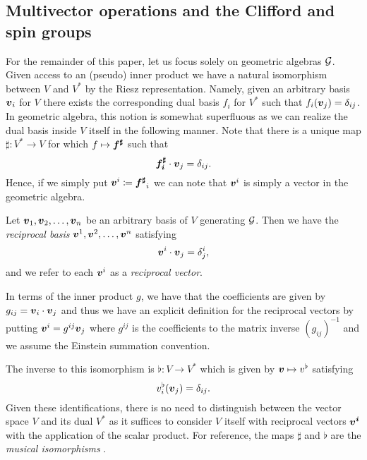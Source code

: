 \subsection{Multivector operations and the Clifford and spin groups}
\label{subsubsec:reverse_inverse_clifford_spin_groups}
For the remainder of this paper, let us focus solely on geometric algebras $\mathcal{G}$. Given access to an (pseudo) inner product we have a natural isomorphism between $V$ and $V^*$ by the Riesz representation.  Namely, given an arbitrary basis $\boldsymbol{v}_i$ for $V$ there exists the corresponding dual basis $f_i$ for $V^*$ such that $f_i(\boldsymbol{v}_j)=\delta_{ij}$. In geometric algebra, this notion is somewhat superfluous as we can realize the dual basis inside $V$ itself in the following manner. Note that there is a unique map $\sharp \colon V^* \to V$ for which $f\mapsto \boldsymbol{f^\sharp}$ such that
\begin{equation}
\boldsymbol{f_i^\sharp} \cdot \boldsymbol{v}_j = \delta_{ij}.
\end{equation}
Hence, if we simply put $\boldsymbol{v}^i \coloneqq \boldsymbol{f^\sharp}_i$ we can note that $\boldsymbol{v}^i$ is simply a vector in the geometric algebra.
\begin{definition}
Let $\boldsymbol{v}_1,\boldsymbol{v}_2,\dots,\boldsymbol{v}_n$ be an arbitrary basis of $V$ generating $\mathcal{G}$. Then we have the \emph{reciprocal basis} $\boldsymbol{v}^1,\boldsymbol{v}^2,\dots,\boldsymbol{v}^n$ satisfying
\begin{equation}
    \boldsymbol{v}^i\cdot \boldsymbol{v}_j = \delta^i_j,
\end{equation}
and we refer to each $\boldsymbol{v}^i$ as a \emph{reciprocal vector}.
\end{definition}
In terms of the inner product $g$, we have that the coefficients are given by $g_{ij}=\boldsymbol{v}_i\cdot \boldsymbol{v}_j$ and thus we have an explicit definition for the reciprocal vectors by putting $\boldsymbol{v}^i = g^{ij}\boldsymbol{v}_j$ where $g^{ij}$ is the coefficients to the matrix inverse $(g_{ij})^{-1}$ and we assume the Einstein summation convention. 

The inverse to this isomorphism is $\flat \colon V \to V^*$ which is given by $\boldsymbol{v} \mapsto v^\flat$ satisfying
\begin{equation}
v_i^\flat (\boldsymbol{v}_j)= \delta_{ij}.
\end{equation}
Given these identifications, there is no need to distinguish between the vector space $V$ and its dual $V^*$ as it suffices to consider $V$ itself with reciprocal vectors $\boldsymbol{v^i}$ with the application of the scalar product. For reference, the maps $\sharp$ and $\flat$ are the \emph{musical isomorphisms} .

